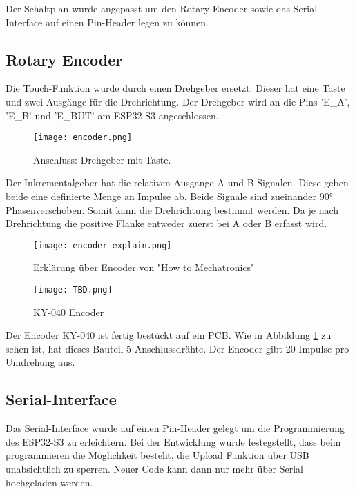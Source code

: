         Der Schaltplan wurde angepasst um den Rotary Encoder sowie das Serial-Interface auf
        einen Pin-Header legen zu können.

        \newpage
        \subsection{Rotary Encoder}
        Die Touch-Funktion wurde durch einen Drehgeber ersetzt. Dieser hat eine Taste und
        zwei Ausgänge für die Drehrichtung. Der Drehgeber wird an die Pins 'E\_A', 'E\_B' und 'E\_BUT'
        am ESP32-S3 angeschlossen. 

            \begin{figure}[h!]
                \centering
                \texttt{[image: encoder.png]}
                \caption{Anschluss: Drehgeber mit Taste.}
                \label{fig:sch6}

            \end{figure}

        
        
        Der Inkrementalgeber hat die relativen Ausgange A und B Signalen. Diese geben beide
        eine definierte Menge an Impulse ab. Beide Signale sind zueinander 90° Phasenverschoben. Somit
        kann die Drehrichtung bestimmt werden. Da je nach Drehrichtung die positive Flanke entweder
        zuerst bei A oder B erfasst wird.

            \begin{figure}[h!]
                \centering
                \texttt{[image: encoder\_explain.png]}
                \caption{Erklärung über Encoder von "How to Mechatronics"\cite{dejan_how_2016}}
                \label{fig:sch7}

            \end{figure}

            \begin{figure}[h!]
                \centering
                \texttt{[image: TBD.png]}
                \caption{KY-040 Encoder}
                \label{fig:sch8}

            \end{figure}
        Der Encoder KY-040 ist fertig bestückt auf ein PCB. Wie in Abbildung \ref{fig:sch6} zu sehen ist, 
        hat dieses Bauteil 5 Anschlussdrähte. Der Encoder gibt 20 Impulse pro Umdrehung aus.

        \newpage
        
        \subsection{Serial-Interface}
        Das Serial-Interface wurde auf einen Pin-Header gelegt um die Programmierung des ESP32-S3
        zu erleichtern. Bei der Entwicklung wurde festegstellt, dass beim programmieren 
        die Möglichkeit besteht, die Upload Funktion über USB unabsichtlich zu sperren. Neuer
        Code kann dann nur mehr über Serial hochgeladen werden. 

